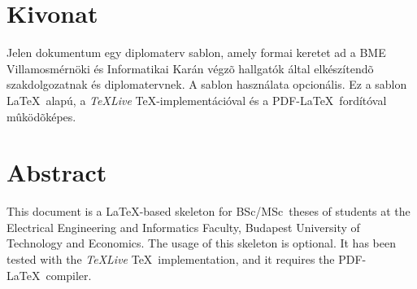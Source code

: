 \chapter*{Kivonat}

Jelen dokumentum egy diplomaterv sablon, amely formai keretet ad a BME Villamosmérnöki és
Informatikai Karán végzõ hallgatók által elkészítendõ szakdolgozatnak és diplomatervnek. A sablon
használata opcionális. Ez a sablon \LaTeX~alapú, a \emph{TeXLive} \TeX-implementációval és
a PDF-\LaTeX~fordítóval mûködõképes.
\vfill

\chapter*{Abstract}

This document is a \LaTeX-based skeleton for BSc/MSc~theses of students at the Electrical
Engineering and Informatics Faculty, Budapest University of Technology and Economics. The usage of
this skeleton is optional. It has been tested with the \emph{TeXLive} \TeX~implementation, and it
requires the PDF-\LaTeX~compiler.
\vfill
